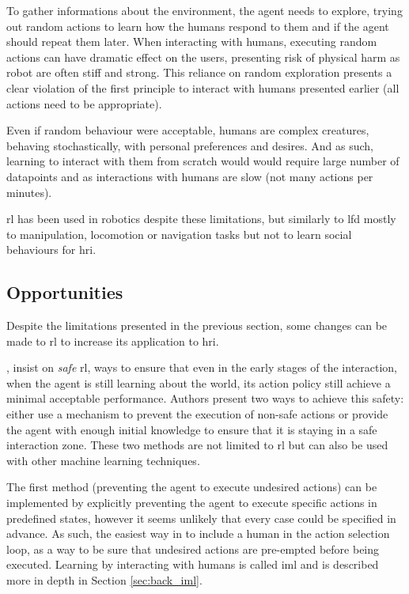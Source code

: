 	To gather informations about the environment, the agent needs to explore, trying out random actions to learn how the humans respond to them and if the agent should repeat them later. When interacting with humans, executing random actions can have dramatic effect on the users, presenting risk of physical harm as robot are often stiff and strong. This reliance on random exploration presents a clear violation of the first principle to interact with humans presented earlier (all actions need to be appropriate).
	
	Even if random behaviour were acceptable, humans are complex creatures, behaving stochastically, with personal preferences and desires. And as such, learning to interact with them from scratch would would require large number of datapoints and as interactions with humans are slow (not many actions per minutes). 
	
	\gls{rl} has been used in robotics despite these limitations\citep{kober2013reinforcement}, but similarly to \gls{lfd} mostly to manipulation, locomotion or navigation tasks but not to learn social behaviours for \gls{hri}. 
	
	
\subsection{Opportunities}  
	Despite the limitations presented in the previous section, some changes can be made to \gls{rl} to increase its application to \gls{hri}.
	  
	\cite{garcia2015comprehensive}, insist on \textit{safe} \gls{rl}, ways to ensure that even in the early stages of the interaction, when the agent is still learning about the world, its action policy still achieve a minimal acceptable performance. Authors present two ways to achieve this safety: either use a mechanism to prevent the execution of non-safe actions or provide the agent with enough initial knowledge to ensure that it is staying in a safe interaction zone. These two methods are not limited to \gls{rl} but can also be used with other machine learning techniques. 
	
	The first method (preventing the agent to execute undesired actions) can be implemented by explicitly preventing the agent to execute specific actions in predefined states, however it seems unlikely that every case could be specified in advance. As such, the easiest way in to include a human in the action selection loop, as a way to be sure that undesired actions are pre-empted before being executed. Learning by interacting with humans is called \acrlong{iml} and is described more in depth in Section \ref{sec:back_iml}.
	
